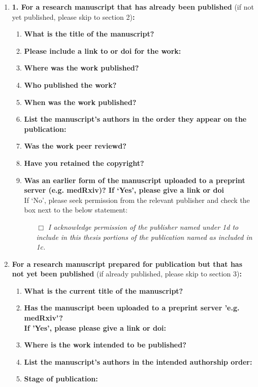 \begin{enumerate}\itemsep0em
%
\item \textbf{1.	For a research manuscript that has already been published} (if not yet published, please skip to section 2)\textbf{:}
%
\begin{enumerate}\itemsep0em
%
\item \textbf{What is the title of the manuscript?}
\item \textbf{Please include a link to or doi for the work:}
\item \textbf{Where was the work published?}
\item \textbf{Who published the work?}
\item \textbf{When was the work published?}
\item \textbf{List the manuscript's authors in the order they appear on the publication:}
\item \textbf{Was the work peer reviewd?}
\item \textbf{Have you retained the copyright?}
\item \textbf{Was an earlier form of the manuscript uploaded to a preprint server (e.g. medRxiv)? If ‘Yes’, please give a link or doi}
\\
If ‘No’, please seek permission from the relevant publisher and check the box next to the below statement:
%
\begin{itemize}\itemsep0em
\item[$\Box$] {\itshape I acknowledge permission of the publisher named under 1d to include in this thesis portions of the publication named as included in 1c.}
\end{itemize}
%
\end{enumerate}
%
\item \textbf{For a research manuscript prepared for publication but that has not yet been published} (if already published, please skip to section 3)\textbf{:}
%
\begin{enumerate}\itemsep0em
	\item \textbf{What is the current title of the manuscript?}
	\item \textbf{Has the manuscript been uploaded to a preprint server 'e.g. medRxiv'?
	\\
	If 'Yes', please please give a link or doi:}
	\item \textbf{Where is the work intended to be published?}
	\item \textbf{List the manuscript's authors in the intended authorship order:}
	\item \textbf{Stage of publication:}
\end{enumerate}


\end{enumerate}
